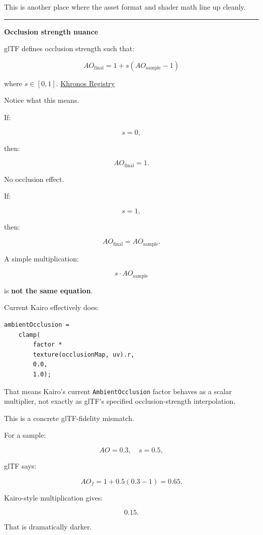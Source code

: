 This is another place where the asset format and shader math line up cleanly.

\begin{center}\rule{0.5\linewidth}{0.5pt}\end{center}

\textbf{Occlusion strength nuance}

glTF defines occlusion strength such that:

\[
\boxed{
AO_{\text{final}}
=
1+
s(AO_{\text{sample}}-1)
}
\]

where \(s\in[0,1]\). \href{https://registry.khronos.org/glTF/specs/2.0/glTF-2.0.html?initialSessionID=262-7493612-7323838&ld=ASXXSCTFRDirect&utm_source=chatgpt.com}{Khronos Registry}

Notice what this means.

If:

\[
s=0,
\]

then:

\[
AO_{\text{final}}=1.
\]

No occlusion effect.

If:

\[
s=1,
\]

then:

\[
AO_{\text{final}}
=
AO_{\text{sample}}.
\]

A simple multiplication:

\[
s\cdot AO_{\text{sample}}
\]

is \textbf{not the same equation}.

Current Kairo effectively does:

\begin{verbatim}
ambientOcclusion =
    clamp(
        factor *
        texture(occlusionMap, uv).r,
        0.0,
        1.0);
\end{verbatim}

That means Kairo's current \texttt{AmbientOcclusion} factor behaves as a scalar multiplier, not exactly as glTF's specified occlusion-strength interpolation.

This is a concrete glTF-fidelity mismatch.

For a sample:

\[
AO=0.3,
\quad
s=0.5,
\]

glTF says:

\[
AO_f=
1+0.5(0.3-1)
=
0.65.
\]

Kairo-style multiplication gives:

\[
0.15.
\]

That is dramatically darker.

